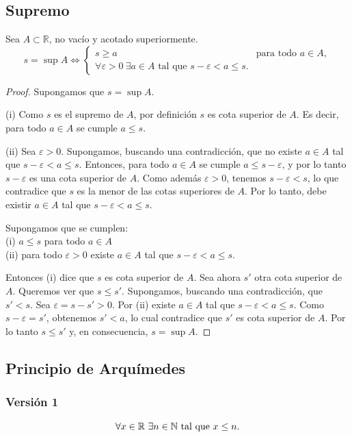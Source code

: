 \subsection{Supremo}
Sea $A \subset\mathbb{R}$, no vacío y acotado superiormente.
\[
s = \sup A \Longleftrightarrow
\begin{cases}
s \ge a & \text{para todo } a \in A,\\[4pt]
\forall \varepsilon > 0 \ \exists a \in A \text{ tal que } s - \varepsilon < a \le s.
\end{cases}
\]
\begin{proof}
Supongamos que $s = \sup A$.

(i) Como $s$ es el supremo de $A$, por definición $s$ es cota superior de $A$.
Es decir, para todo $a \in A$ se cumple $a \le s$.

(ii) Sea $\varepsilon>0$. Supongamos, buscando una contradicción, que no existe
$a \in A$ tal que $s-\varepsilon < a \le s$. Entonces, para todo $a \in A$
se cumple $a \le s-\varepsilon$, y por lo tanto $s-\varepsilon$ es una cota
superior de $A$. Como además $\varepsilon>0$, tenemos $s-\varepsilon < s$,
lo que contradice que $s$ es la menor de las cotas superiores de $A$.
Por lo tanto, debe existir $a \in A$ tal que $s-\varepsilon < a \le s$.

Supongamos que se cumplen:
\\
(i) $a \le s$ para todo $a \in A$\\
(ii) para todo $\varepsilon>0$ existe $a \in A$ tal que $s-\varepsilon < a \le s$.

Entonces (i) dice que $s$ es cota superior de $A$.
Sea ahora $s'$ otra cota superior de $A$. Queremos ver que $s \le s'$.
Supongamos, buscando una contradicción, que $s' < s$.
Sea $\varepsilon = s - s' > 0$. Por (ii) existe $a \in A$ tal que
$s-\varepsilon < a \le s$. Como $s-\varepsilon = s'$, obtenemos $s' < a$,
lo cual contradice que $s'$ es cota superior de $A$.
Por lo tanto $s \le s'$ y, en consecuencia, $s = \sup A$.
\end{proof}

\subsection{Principio de Arquímedes}

\subsubsection*{Versión 1}
\[
\forall x \in \mathbb{R} \ \exists n \in \mathbb{N} \text{ tal que } x \le n.
\]

